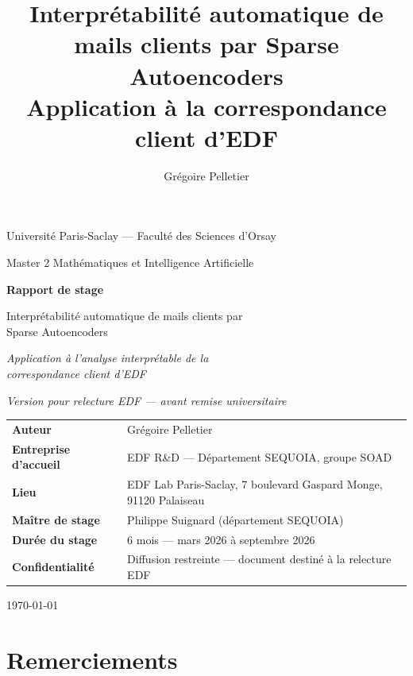 \documentclass[11pt]{article}
\title{Interprétabilité automatique de mails clients par Sparse Autoencoders\\
\large Application à la correspondance client d'EDF}
\author{Grégoire Pelletier}
\date{}
\begin{document}
\begin{titlepage}
\centering
\vspace*{1cm}
{\large Université Paris-Saclay --- Faculté des Sciences d'Orsay\par}
{\large Master 2 Mathématiques et Intelligence Artificielle\par}
\vspace{2cm}
{\Huge\bfseries Rapport de stage\par}
\vspace{0.5cm}
{\LARGE Interprétabilité automatique de mails clients par\\ Sparse Autoencoders\par}
\vspace{0.3cm}
{\Large\itshape Application à l'analyse interprétable de la\\ correspondance client d'EDF\par}
\vspace{0.6cm}
{\normalsize\itshape Version pour relecture EDF --- avant remise universitaire\par}
\vspace{1.9cm}

\begin{tabular}{ll}
\textbf{Auteur} & Grégoire Pelletier \\[0.3em]
\textbf{Entreprise d'accueil} & EDF R\&D --- Département SEQUOIA, groupe SOAD \\[0.3em]
\textbf{Lieu} & EDF Lab Paris-Saclay, 7 boulevard Gaspard Monge, 91120 Palaiseau \\[0.3em]
\textbf{Maître de stage} & Philippe Suignard (département SEQUOIA) \\[0.3em]
\textbf{Durée du stage} & 6 mois --- mars 2026 à septembre 2026 \\[0.3em]
\textbf{Confidentialité} & Diffusion restreinte --- document destiné à la relecture EDF \\[0.3em]
\end{tabular}

\vfill
{\large \today\par}
\end{titlepage}

\newpage
\section*{Remerciements}
\end{document}
